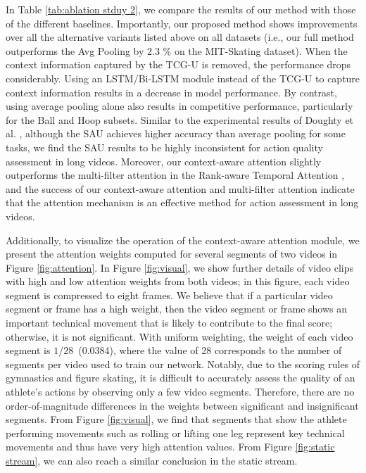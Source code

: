 \documentclass[sigconf]{acmart}
\begin{document}
In Table \ref{tab:ablation stduy 2}, we compare the results of our method with those of the different baselines. Importantly, our proposed method shows improvements over all the alternative variants listed above on all datasets (i.e., our full method outperforms the Avg Pooling by 2.3 \% on the MIT-Skating dataset). When the context information captured by the TCG-U is removed, the performance drops considerably. Using an LSTM/Bi-LSTM module instead of the TCG-U to capture context information results in a decrease in model performance. By contrast, using average pooling alone also results in competitive performance, particularly for the Ball and Hoop subsets.
Similar to the experimental results of Doughty et al. \cite{doughty2019pros}, although the SAU achieves higher accuracy than average pooling for some tasks, we find the SAU results to be highly inconsistent for action quality assessment in long videos. 
Moreover, our context-aware attention slightly outperforms the multi-filter attention in the Rank-aware Temporal Attention \cite{doughty2019pros}, and the success of our context-aware attention and multi-filter attention indicate that the attention mechanism is an effective method for action assessment in long videos.

Additionally, to visualize the operation of the context-aware attention module, we present the attention weights computed for several segments of two videos in Figure \ref{fig:attention}. In Figure \ref{fig:visual}, we show further details of video clips with high and low attention weights from both videos; in this figure, each video segment is compressed to eight frames. We believe that if a particular video segment or frame has a high weight, then the video segment or frame shows an important technical movement that is likely to contribute to the final score; otherwise, it is not significant. With uniform weighting, the weight of each video segment is $1/28$~(0.0384), where the value of 28 corresponds to the number of segments per video used to train our network. Notably, due to the scoring rules of gymnastics and figure skating, it is difficult to accurately assess the quality of an athlete's actions by observing only a few video segments. Therefore, there are no order-of-magnitude differences in the weights between significant and insignificant segments. From Figure \ref{fig:visual}, we find that segments that show the athlete performing movements such as rolling or lifting one leg represent key technical movements and thus have very high attention values. From Figure \ref{fig:static stream}, we can also reach a similar conclusion in the static stream.
\end{document}
